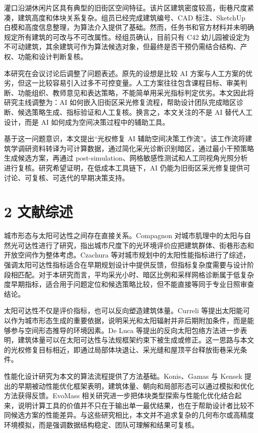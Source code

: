 \documentclass[UTF8,zihao=-4,a4paper]{ctexart}
\begin{document}
灌口沿湖休闲片区具有典型的旧街区空间特征。该片区建筑密度较高，街巷尺度紧凑，建筑高度和体块关系复杂。组员已经完成建筑编号、CAD 标注、SketchUp 白模和高度信息整理，为算法介入提供了基础。然而，任务书和官方材料并未明确规定所有建筑的可改与不可改属性。经组员确认，目前只有 C42 幼儿园被设定为不可动建筑，其余建筑可作为算法候选对象，但最终是否干预仍需结合结构、产权、功能和设计判断复核。

本研究在会议讨论后调整了问题表述。原先的设想是比较 AI 方案与人工方案的优劣，但这一比较容易引入过多不可控变量。人工方案往往包含课程目标、审美判断、功能组织、教师意见和表达策略，不能简单用采光指标判定优劣。本文因此将研究主线调整为：AI 如何嵌入旧街区采光修复流程，帮助设计团队完成暗区诊断、候选策略生成、指标验证和人工复核。换言之，本文关注的不是 AI 替代人工设计，而是 AI 如何成为空间决策过程中的辅助工具。

基于这一问题意识，本文提出“光权修复 AI 辅助空间决策工作流”。该工作流将建筑学调研资料转译为可计算数据，通过简化采光诊断识别暗区，通过最小干预策略生成候选方案，再通过 post-simulation、网格敏感性测试和人工同视角光照分析进行复核。研究希望证明，在低成本工具链下，AI 仍能为旧街区采光修复提供可讨论、可复核、可迭代的早期决策支持。

\section{2 文献综述}
城市形态与太阳可达性之间存在直接关系。Compagnon 对城市肌理中的太阳与自然光可达性进行了研究，指出城市尺度下的光环境评价应把建筑群体、街巷形态和开放空间作为整体考虑。Czachura 等对城市规划中的太阳性能指标进行了综述，强调太阳可达性指标适合在早期规划设计中提供反馈，但指标复杂度需要与设计阶段相匹配。对于本研究而言，平均采光小时、暗区比例和采样网格诊断属于低复杂度早期指标，适合用于问题定位和候选策略比较，但不能直接等同于专业日照审查结论。

太阳可达性不仅是评价指标，也可以反向塑造建筑体量。Curreli 等提出太阳能可以作为城市形态生成的重要依据，说明采光和太阳辐射并非后期附加条件，而是能够参与空间形态推导的环境因素。De Luca 等提出的反向太阳包络方法进一步表明，建筑体量可以在太阳可达性与法规框架约束下被生成或修正。这一思路与本文的光权修复目标相近，即通过局部体块退让、采光缝和屋顶平台释放街巷采光条件。

性能化设计研究为本文的算法流程提供了方法基础。Konis、Gamas 与 Kensek 提出的早期被动性能优化框架表明，建筑体量、朝向和局部形态可以通过模拟和优化方法获得反馈。EvoMass 相关研究进一步把体块类型探索与性能化优化结合起来，说明计算工具的价值并不只在于输出单一最优结果，也在于帮助设计者比较不同候选方案的性能差异。与这些研究相比，本文并不追求复杂的几何布尔或高精度环境模拟，而是强调数据结构稳定、团队可理解和结果可复核。
\end{document}
